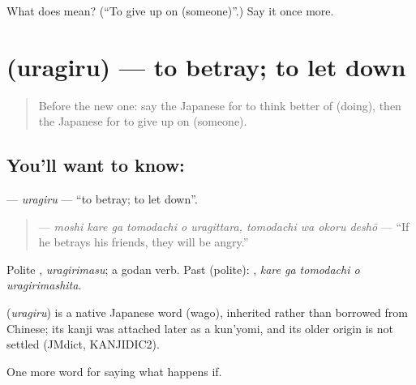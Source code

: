 \begin{tcolorbox}[breakable,colback=teal!4,colframe=teal!35!black,title={Before you move on}]
What does  mean? (\textquotedblleft{}To give up on (someone)\textquotedblright{}.) Say it once more.
\end{tcolorbox}
\section[\texorpdfstring{\ja{うらぎる} (uragiru)}{うらぎる (uragiru)}]{ (uragiru) — to betray; to let down}

\label{lesson:JA-C519-uragiru}



\begin{quote}
Before the new one: say the Japanese for to think better of (doing), then the Japanese for to give up on (someone).
\end{quote}

\subsection*{You'll want to know: }
\textbf{} — \emph{uragiru} — \textquotedblleft{}to betray; to let down\textquotedblright{}.

\begin{quote}
\textbf{    } — \emph{moshi kare ga tomodachi o uragittara, tomodachi wa okoru deshō} — \textquotedblleft{}If he betrays his friends, they will be angry.\textquotedblright{}
\end{quote}

Polite \textbf{}, \emph{uragirimasu}; a godan verb. Past (polite): \textbf{  }, \emph{kare ga tomodachi o uragirimashita}.

\begin{cousinweb}
\textbf{} (\emph{uragiru}) is a native Japanese word (wago), inherited rather than borrowed from Chinese; its kanji was attached later as a kun'yomi, and its older origin is not settled (JMdict, KANJIDIC2).
\end{cousinweb}

\begin{grammarlens}[title={What you've built}]
One more word for saying what happens if.
\end{grammarlens}

